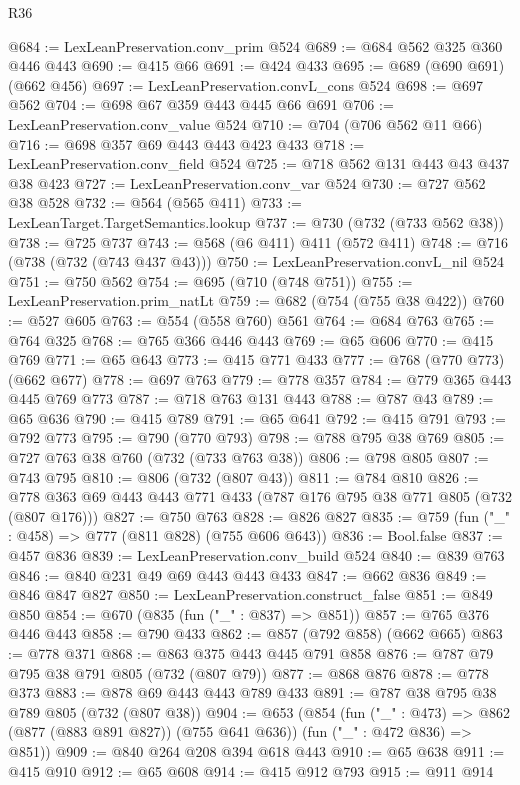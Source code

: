 \begin{lexlean}{R36}
\begin{coremodule}
@684 := LexLeanPreservation.conv_prim @524
@689 := @684 @562 @325 @360 @446 @443
@690 := @415 @66
@691 := @424 @433
@695 := @689 (@690 @691) (@662 @456)
@697 := LexLeanPreservation.convL_cons @524
@698 := @697 @562
@704 := @698 @67 @359 @443 @445 @66 @691
@706 := LexLeanPreservation.conv_value @524
@710 := @704 (@706 @562 @11 @66)
@716 := @698 @357 @69 @443 @443 @423 @433
@718 := LexLeanPreservation.conv_field @524
@725 := @718 @562 @131 @443 @43 @437 @38 @423
@727 := LexLeanPreservation.conv_var @524
@730 := @727 @562 @38 @528
@732 := @564 (@565 @411)
@733 := LexLeanTarget.TargetSemantics.lookup
@737 := @730 (@732 (@733 @562 @38))
@738 := @725 @737
@743 := @568 (@6 @411) @411 (@572 @411)
@748 := @716 (@738 (@732 (@743 @437 @43)))
@750 := LexLeanPreservation.convL_nil @524
@751 := @750 @562
@754 := @695 (@710 (@748 @751))
@755 := LexLeanPreservation.prim_natLt
@759 := @682 (@754 (@755 @38 @422))
@760 := @527 @605
@763 := @554 (@558 @760) @561
@764 := @684 @763
@765 := @764 @325
@768 := @765 @366 @446 @443
@769 := @65 @606
@770 := @415 @769
@771 := @65 @643
@773 := @415 @771 @433
@777 := @768 (@770 @773) (@662 @677)
@778 := @697 @763
@779 := @778 @357
@784 := @779 @365 @443 @445 @769 @773
@787 := @718 @763 @131 @443
@788 := @787 @43
@789 := @65 @636
@790 := @415 @789
@791 := @65 @641
@792 := @415 @791
@793 := @792 @773
@795 := @790 (@770 @793)
@798 := @788 @795 @38 @769
@805 := @727 @763 @38 @760 (@732 (@733 @763 @38))
@806 := @798 @805
@807 := @743 @795
@810 := @806 (@732 (@807 @43))
@811 := @784 @810
@826 := @778 @363 @69 @443 @443 @771 @433 (@787 @176 @795 @38 @771 @805 (@732 (@807 @176)))
@827 := @750 @763
@828 := @826 @827
@835 := @759 (fun ("_" : @458) => @777 (@811 @828) (@755 @606 @643))
@836 := Bool.false
@837 := @457 @836
@839 := LexLeanPreservation.conv_build @524
@840 := @839 @763
@846 := @840 @231 @49 @69 @443 @443 @433
@847 := @662 @836
@849 := @846 @847 @827
@850 := LexLeanPreservation.construct_false
@851 := @849 @850
@854 := @670 (@835 (fun ("_" : @837) => @851))
@857 := @765 @376 @446 @443
@858 := @790 @433
@862 := @857 (@792 @858) (@662 @665)
@863 := @778 @371
@868 := @863 @375 @443 @445 @791 @858
@876 := @787 @79 @795 @38 @791 @805 (@732 (@807 @79))
@877 := @868 @876
@878 := @778 @373
@883 := @878 @69 @443 @443 @789 @433
@891 := @787 @38 @795 @38 @789 @805 (@732 (@807 @38))
@904 := @653
    (@854
      (fun ("_" : @473) => @862 (@877 (@883 @891 @827)) (@755 @641 @636))
      (fun ("_" : @472 @836) => @851))
@909 := @840 @264 @208 @394 @618 @443
@910 := @65 @638
@911 := @415 @910
@912 := @65 @608
@914 := @415 @912 @793
@915 := @911 @914

\end{coremodule}
\end{lexlean}
